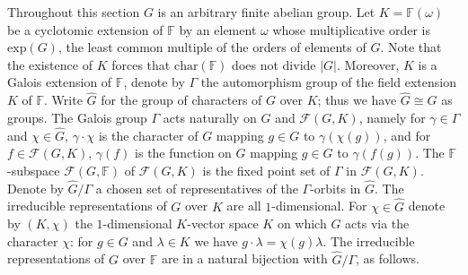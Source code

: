 \documentclass[12pt, oneside]{amsart}
\def\field{K}
\def\FF{\mathbb{F}}
\begin{document}
Throughout this section $G$ is an arbitrary finite abelian group. 
Let $\field=\FF(\omega)$ be a cyclotomic extension of $\FF$ by an element $\omega$ whose multiplicative order is 
$\mathrm{exp}(G)$, the least common multiple of the orders of elements of $G$. 
Note that the existence of $\field$ forces that $\mathrm{char}(\FF)$ does not divide $|G|$. 
Moreover, $\field$ is a Galois extension of $\FF$, denote by $\Gamma$ the automorphism group of the field extension $\field$ of   
$\FF$. 
Write $\widehat G$ for the group of characters of $G$ over $\field$; 
thus we have $\widehat G\cong G$ as groups. 
The Galois group $\Gamma$ acts naturally on $\widehat G$ and $\mathcal{F}(G,\field)$, namely 
for $\gamma\in \Gamma$ and $\chi\in \widehat G$,   
$\gamma\cdot \chi$ is the character of $G$ mapping $g\in G$ to $\gamma(\chi(g))$, and for 
$f\in\mathcal{F}(G,\field)$, $\gamma(f)$ is the function on $G$ mapping $g\in G$ to $\gamma(f(g))$. 
The $\FF$-subspace $\mathcal{F}(G,\FF)$ of $\mathcal{F}(G,\field)$ is the fixed point set of $\Gamma$ in 
$\mathcal{F}(G,\field)$. 
Denote by $\widehat G/\Gamma$ a chosen set of representatives of the $\Gamma$-orbits in $\widehat G$. 
The irreducible representations of $G$ over $\field$ are all $1$-dimensional.  For 
$\chi\in \widehat G$ denote by $(\field,\chi)$ the $1$-dimensional $\field$-vector space  $\field$ on which 
$G$ acts via the character $\chi$: for $g\in G$ and $\lambda\in \field$ we have 
$g\cdot \lambda=\chi(g)\lambda$. The irreducible representations of $G$ over $\FF$ are in a natural bijection with 
$\widehat G/\Gamma$, as follows. 
\end{document}
